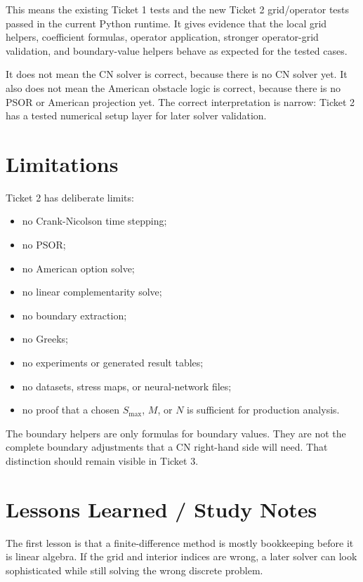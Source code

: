\documentclass[11pt,a4paper]{article}
\begin{document}
This means the existing Ticket 1 tests and the new Ticket 2 grid/operator tests passed in the
current Python runtime. It gives evidence that the local grid helpers, coefficient formulas,
operator application, stronger operator-grid validation, and boundary-value helpers behave as
expected for the tested cases.

It does not mean the CN solver is correct, because there is no CN solver yet. It also does not
mean the American obstacle logic is correct, because there is no PSOR or American projection yet.
The correct interpretation is narrow: Ticket 2 has a tested numerical setup layer for later
solver validation.

\section{Limitations}

Ticket 2 has deliberate limits:
\begin{itemize}
  \item no Crank-Nicolson time stepping;
  \item no PSOR;
  \item no American option solve;
  \item no linear complementarity solve;
  \item no boundary extraction;
  \item no Greeks;
  \item no experiments or generated result tables;
  \item no datasets, stress maps, or neural-network files;
  \item no proof that a chosen \(S_{\max}\), \(M\), or \(N\) is sufficient for production analysis.
\end{itemize}

The boundary helpers are only formulas for boundary values. They are not the complete boundary
adjustments that a CN right-hand side will need. That distinction should remain visible in Ticket
3.

\section{Lessons Learned / Study Notes}

The first lesson is that a finite-difference method is mostly bookkeeping before it is linear
algebra. If the grid and interior indices are wrong, a later solver can look sophisticated while
still solving the wrong discrete problem.
\end{document}
